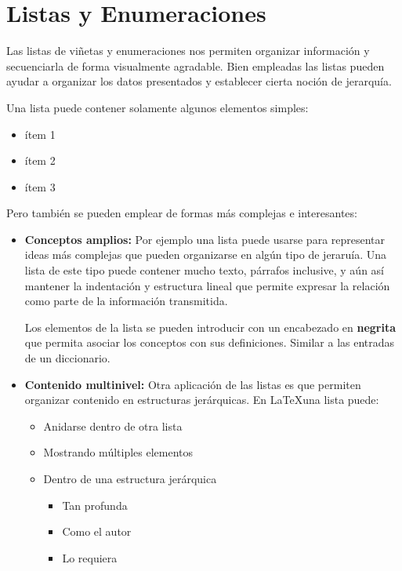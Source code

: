 \documentclass{report}
\begin{document}
\section{Listas y Enumeraciones}\label{listas}

Las listas de viñetas y enumeraciones nos permiten organizar información y secuenciarla de forma visualmente agradable. Bien empleadas las listas pueden ayudar a organizar los datos presentados y establecer cierta noción de jerarquía.

Una lista puede contener solamente algunos elementos simples:
\begin{itemize}
    \item ítem 1
    \item ítem 2
    \item ítem 3
\end{itemize}

Pero también se pueden emplear de formas más complejas e interesantes:

\begin{itemize}
    \item \textbf{Conceptos amplios:} Por ejemplo una lista puede usarse para representar ideas más complejas que pueden organizarse en algún tipo de jeraruía. 
    Una lista de este tipo puede contener mucho texto, párrafos inclusive, y aún así mantener la indentación y estructura lineal que permite expresar la relación como parte de la información transmitida.
    
    Los elementos de la lista se pueden introducir con un encabezado en \textbf{negrita} que permita asociar los conceptos con sus definiciones. Similar a las entradas de un diccionario.
    
    \item \textbf{Contenido multinivel:} Otra aplicación de las listas es que permiten organizar contenido en estructuras jerárquicas. En \LaTeX una lista puede:
    
    \begin{itemize}
        \item Anidarse dentro de otra lista
        \item Mostrando múltiples elementos
        \item Dentro de una estructura jerárquica
        \begin{itemize}
            \item Tan profunda
            \item Como el autor
            \item Lo requiera
        \end{itemize}
    \end{itemize}
\end{itemize}
\end{document}

